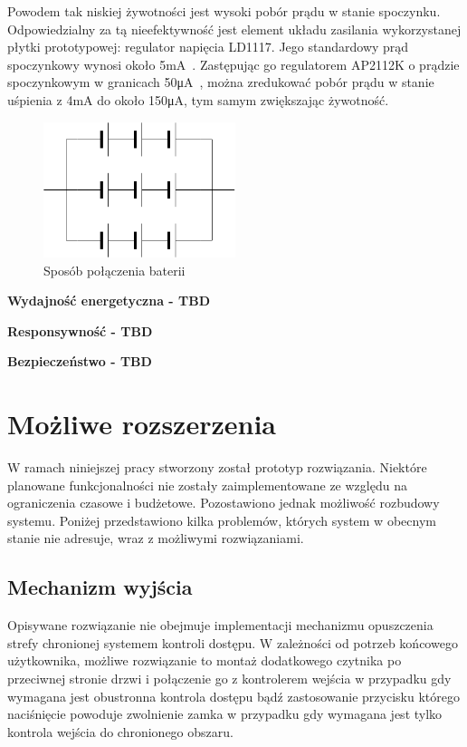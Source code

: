     Powodem tak niskiej żywotności jest wysoki pobór prądu w stanie spoczynku. Odpowiedzialny za tą nieefektywność jest element układu zasilania wykorzystanej płytki prototypowej: regulator napięcia LD1117. Jego standardowy prąd spoczynkowy wynosi około 5mA~\cite{AMS1117-ds}. Zastępując go regulatorem AP2112K o prądzie spoczynkowym w granicach 50μA~\cite{AP2112K-ds}, można zredukować pobór prądu w stanie uśpienia z 4mA do około 150μA, tym samym zwiększając żywotność.

    \begin{figure}[]
        \centering
        \includegraphics[width=0.5\textwidth]{chapters/images/battery_layout.png}
        \caption{Sposób połączenia baterii}
        \label{fig:battery_layout}
    \end{figure}


	\textbf{Wydajność energetyczna - TBD}

	\textbf{Responsywność - TBD}

	\textbf{Bezpieczeństwo - TBD}

	\section{Możliwe rozszerzenia}

        W ramach niniejszej pracy stworzony został prototyp rozwiązania. Niektóre planowane funkcjonalności nie zostały zaimplementowane ze względu na ograniczenia czasowe i budżetowe. Pozostawiono jednak możliwość rozbudowy systemu. Poniżej przedstawiono kilka problemów, których system w obecnym stanie nie adresuje, wraz z możliwymi rozwiązaniami.

        \subsection{Mechanizm wyjścia}

            Opisywane rozwiązanie nie obejmuje implementacji mechanizmu opuszczenia strefy chronionej systemem kontroli dostępu. W zależności od potrzeb końcowego użytkownika, możliwe rozwiązanie to montaż dodatkowego czytnika po przeciwnej stronie drzwi i połączenie go z kontrolerem wejścia w przypadku gdy wymagana jest obustronna kontrola dostępu bądź zastosowanie przycisku którego naciśnięcie powoduje zwolnienie zamka w przypadku gdy wymagana jest tylko kontrola wejścia do chronionego obszaru.


